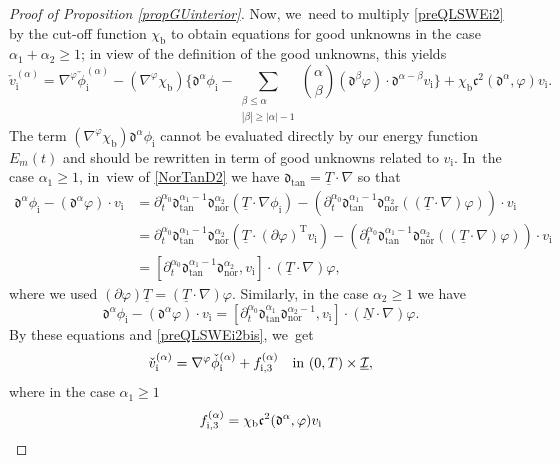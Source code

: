 \documentclass[10pt]{amsart}
\newcommand{\dtan}{{\mathfrak d}_\mathrm{tan}}
\newcommand{\dnor}{{\mathfrak d}_\mathrm{nor}}
\newcommand{\dt}{\partial_t}
\newcommand{\cI}{{\mathcal I}}
\newcommand{\ul}[1]{\underline{#1}}
\theoremstyle{definition}
\begin{document}
\begin{proof}[Proof of Proposition \ref{propGUinterior}]
Now, we~need to multiply \eqref{preQLSWEi2} by the cut-off function $\chi_\mathrm{b}$ to obtain equations for good unknowns in the case $\alpha_1+\alpha_2\geq1$;
in view of the definition of the good unknowns, this yields
\begin{equation}\label{preQLSWEi2bis}
\check{v}_\mathrm{i}^{(\alpha)}=\nabla^\varphi \check\phi_\mathrm{i}^{(\alpha)}-(\nabla^\varphi \chi_\mathrm{b})
\biggl\{ \mathfrak{d}^{\alpha}\phi_\mathrm{i}
- \sum_{\substack{\beta\leq\alpha\\ |\beta|\geq|\alpha|-1}} \binom{\alpha}{\beta}
(\mathfrak{d}^{\beta}\varphi)\cdot\mathfrak{d}^{\alpha-\beta}v_\mathrm{i} \biggr\} + \chi_\mathrm{b}{\mathfrak c}^2(\mathfrak{d}^\alpha,\varphi)v_\mathrm{i}.
\end{equation}
The term $(\nabla^\varphi\chi_\mathrm{b})\mathfrak{d}^{\alpha}\phi_\mathrm{i}$ cannot be evaluated directly by our energy
function $E_m(t)$ and should be rewritten in term of good unknowns related to $v_\mathrm{i}$. In~the case $\alpha_1\geq1$, in~view of \eqref{NorTanD2} we have $\dtan=\ul{T}\cdot\nabla$ so that
\begin{align*}
\mathfrak{d}^{\alpha}\phi_\mathrm{i} - (\mathfrak{d}^{\alpha}\varphi)\cdot v_\mathrm{i}
&= \dt^{\alpha_0}\dtan^{\alpha_1-1}\dnor^{\alpha_2}(\ul{T}\cdot\nabla\phi_\mathrm{i})
- (\dt^{\alpha_0}\dtan^{\alpha_1-1}\dnor^{\alpha_2}((\ul{T}\cdot\nabla)\varphi))\cdot v_\mathrm{i} \\
&= \dt^{\alpha_0}\dtan^{\alpha_1-1}\dnor^{\alpha_2}(\ul{T}\cdot(\partial\varphi)^\mathrm{T}v_\mathrm{i})
- (\dt^{\alpha_0}\dtan^{\alpha_1-1}\dnor^{\alpha_2}((\ul{T}\cdot\nabla)\varphi))\cdot v_\mathrm{i} \nonumber \\
&= [\dt^{\alpha_0}\dtan^{\alpha_1-1}\dnor^{\alpha_2},v_\mathrm{i}]\cdot(\ul{T}\cdot\nabla)\varphi, \nonumber
\end{align*}
where we used $(\partial\varphi)\ul{T}=(\ul{T}\cdot\nabla)\varphi$.
Similarly, in the case $\alpha_2\geq1$ we have
\[
\mathfrak{d}^{\alpha}\phi_\mathrm{i} - (\mathfrak{d}^{\alpha}\varphi)\cdot v_\mathrm{i}
= [\dt^{\alpha_0}\dtan^{\alpha_1}\dnor^{\alpha_2-1},v_\mathrm{i}]\cdot(\ul{N}\cdot\nabla)\varphi.
\]
By these equations and \eqref{preQLSWEi2bis}, we~get
\[
\check{v}_\mathrm{i}^{(\alpha)} = \nabla^\varphi\check{\phi}_\mathrm{i}^{(\alpha)} + f_{{\rm i},3}^{(\alpha)} \quad\text{in } (0,T)\times\ul{\cI},
\]
where in the case $\alpha_1\geq1$
\begin{multline}\label{deffi3}
f_{{\rm i},3}^{(\alpha)}
= \chi_\mathrm{b} \mathfrak{c}^2(\mathfrak{d}^\alpha,\varphi)v_\mathrm{i} \\

\end{multline}
\end{proof}
\end{document}
